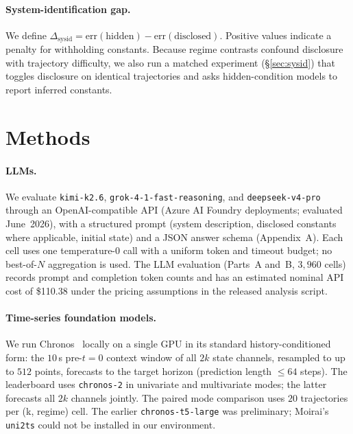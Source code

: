 \documentclass{article}
\begin{document}
\paragraph{System-identification gap.} We define
$\Delta_{\mathrm{sysid}}=\mathrm{err}(\text{hidden})-\mathrm{err}(\text{disclosed})$.
Positive values indicate a penalty for withholding constants. Because regime contrasts
confound disclosure with trajectory difficulty, we also run a matched experiment
(\S\ref{sec:sysid}) that toggles disclosure on identical trajectories and asks hidden-condition
models to report inferred constants.

\section{Methods}
\label{sec:methods}
\paragraph{LLMs.} We evaluate \texttt{kimi-k2.6}, \texttt{grok-4-1-fast-reasoning}, and
\texttt{deepseek-v4-pro} through an OpenAI-compatible API (Azure AI Foundry deployments;
evaluated June~2026), with a structured prompt (system description, disclosed constants where
applicable, initial state) and a JSON answer schema (Appendix~A). Each cell uses one
temperature-$0$ call with a uniform token and timeout budget; no best-of-$N$ aggregation is
used. The LLM evaluation (Parts~A and~B, $3{,}960$ cells) records prompt and completion
token counts and has an estimated nominal API cost of \$110.38 under the pricing assumptions
in the released analysis script.

\paragraph{Time-series foundation models.} We run Chronos~\citep{ansari2024chronos} locally
on a single GPU in its standard history-conditioned form: the $10$\,s pre-$t{=}0$ context
window of all $2k$ state channels, resampled to up to $512$ points, forecasts to the target
horizon (prediction length $\le 64$ steps). The leaderboard uses \texttt{chronos-2} in
univariate and multivariate modes; the latter forecasts all $2k$ channels jointly. The
paired mode comparison uses $20$ trajectories per (k, regime) cell. The earlier
\texttt{chronos-t5-large} was preliminary; Moirai's \texttt{uni2ts} could not be installed
in our environment.
\end{document}
